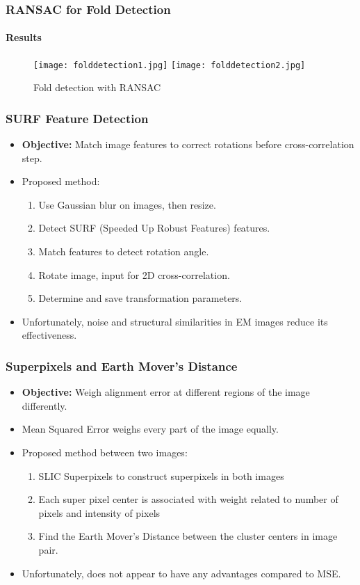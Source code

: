 \documentclass{beamer}
\begin{document}
\begin{frame}
\frametitle{RANSAC for Fold Detection}
\framesubtitle{Results}
\begin{figure}[p]
    \centering
    \texttt{[image: folddetection1.jpg]}
    \texttt{[image: folddetection2.jpg]}
    \caption{Fold detection with RANSAC}
\end{figure}
\end{frame}

\begin{frame}
\frametitle{SURF Feature Detection}
\begin{itemize}
\item \textbf{Objective:} Match image features to correct rotations before cross-correlation step. 
\item Proposed method:
\begin{enumerate}
\item Use Gaussian blur on images, then resize.
\item Detect SURF (Speeded Up Robust Features) features. 
\item Match features to detect rotation angle. 
\item Rotate image, input for 2D cross-correlation.
\item Determine and save transformation parameters.
\end{enumerate}
\item Unfortunately, noise and structural similarities in EM images reduce its effectiveness.
\end{itemize}
\end{frame}

\begin{frame}
\frametitle{Superpixels and Earth Mover's Distance}
\begin{itemize}
\item \textbf{Objective:} Weigh alignment error at different regions of the image differently.
\item Mean Squared Error weighs every part of the image equally.
\item Proposed method between two images:
\begin{enumerate}
\item SLIC Superpixels to construct superpixels in both images
\item Each super pixel center is associated with weight related to number of pixels and intensity of pixels
\item Find the Earth Mover's Distance between the cluster centers in image pair.
\end{enumerate}
\item Unfortunately, does not appear to have any advantages compared to MSE.
\end{itemize}
\end{frame}
\end{document}
